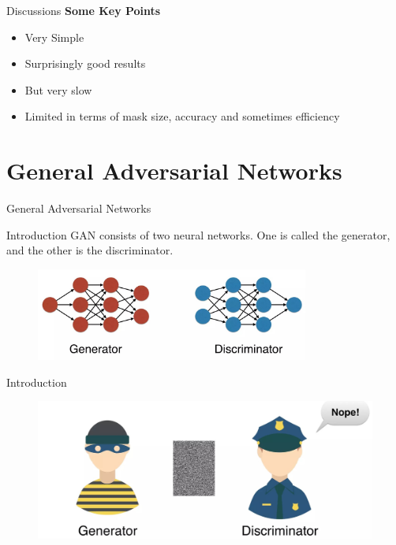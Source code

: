 \documentclass{beamer}
\begin{document}
\begin{frame}{Discussions}
    \textbf{Some Key Points}
    \begin{itemize}
        \item Very Simple
        \item Surprisingly good results 
        \item But very slow
        \item Limited in terms of mask size, accuracy and sometimes efficiency
    \end{itemize}
    
\end{frame}

\section{General Adversarial Networks}

\begin{frame}{}
    \centering
    \Huge{General Adversarial Networks}
\end{frame}

\begin{frame}{Introduction}
    GAN consists of two neural networks. One is called the generator, and the other is the discriminator. 
    
    \begin{figure}[h]
        \centering
        \includegraphics[width=0.8\textwidth]{slide_05.jpg} %
        \captionsetup{labelformat=empty}
    \end{figure}
    
\end{frame}

\begin{frame}{Introduction} 
    \begin{figure}[h]
        \centering
        \includegraphics[width=1.0\textwidth]{slide_06.jpg} %
        \captionsetup{labelformat=empty}
    \end{figure}
    
\end{frame}
\end{document}
